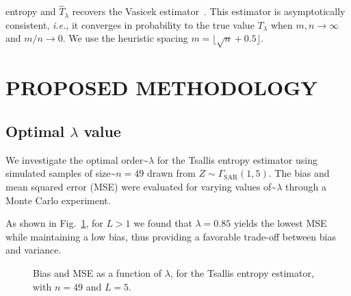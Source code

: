 \documentclass[
  lettersize  journal,
]{IEEEtran}%
\begin{document}
entropy and \(\widehat T_{\lambda}\) recovers the Vasicek
estimator~. This estimator is
asymptotically consistent, \emph{i.e.}, it converges in probability to
the true value \(T_\lambda\) when \(m,n\rightarrow\infty\) and
\(m/n\rightarrow0\). We use the heuristic spacing
\(m=\lfloor\sqrt{n}+0.5\rfloor\).

\section{PROPOSED METHODOLOGY}\label{sec:met}

\subsection{\texorpdfstring{Optimal \(\lambda\)
value}{Optimal \textbackslash lambda value}}\label{optimal-lambda-value}

We investigate the optimal order\textasciitilde{}\(\lambda\) for the
Tsallis entropy estimator using simulated samples of
size\textasciitilde{}\(n = 49\) drawn from
\(Z \sim \Gamma_{\text{SAR}}(1,5)\). The bias and mean squared error
(MSE) were evaluated for varying values of\textasciitilde{}\(\lambda\)
through a Monte Carlo experiment.

As shown in Fig.~\ref{fig-optimal_order-tsallis}, for \(L>1\) we found
that \(\lambda=0.85\) yields the lowest MSE while maintaining a low
bias, thus providing a favorable trade-off between bias and variance.

\begin{figure}[H]


\caption{\label{fig-optimal_order-tsallis}Bias and MSE as a function of
\(\lambda\), for the Tsallis entropy estimator, with \(n = 49\) and
\(L = 5\).}

\end{figure}%
\end{document}
